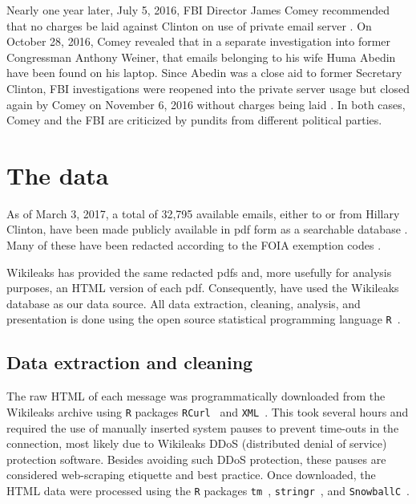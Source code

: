 \documentclass[journal]{vgtc}                %
\begin{document}
Nearly one year later, July 5, 2016,  FBI Director James Comey recommended that no charges be laid against Clinton on use of private email server \cite{nochargeFBI}.  On October 28, 2016, Comey revealed that in a separate investigation into former Congressman Anthony Weiner, that emails belonging to his wife Huma Abedin have been found on his laptop.  Since Abedin was a close aid to former Secretary Clinton, FBI investigations were reopened into the private server usage but closed again by Comey on November 6, 2016 without charges being laid \cite{nochargeFBINov}.  In both cases, Comey and the FBI are criticized by pundits from different political parties.

\section{The data}
\label{sect:data}
As of March 3, 2017, a total of 32,795 available emails, either to or from Hillary Clinton, have been made publicly available in pdf form as a searchable database \cite{StateDeptFOIA}.  Many of these have been redacted according to the FOIA exemption codes \cite{FOIA}.  

Wikileaks \cite{Wikileaks} has provided the same redacted pdfs and, more usefully for analysis purposes, an HTML version of each pdf.  Consequently, have used the Wikileaks database as our data source.   All data extraction, cleaning, analysis, and presentation is done using the open source statistical programming language \texttt{R}~\cite{Rsystem}.

\subsection{Data extraction and cleaning}
\label{sect:data:extrclean}
The raw HTML of each message was programmatically downloaded from the Wikileaks archive using \texttt{R} packages  \texttt{RCurl}~\cite{RCurl2016package} and \texttt{XML}~\cite{XML2016package}.  This took several hours and required the use of manually inserted system pauses to prevent time-outs in the connection, most likely due to Wikileaks DDoS (distributed denial of service) protection software. Besides avoiding such DDoS protection, these pauses are considered web-scraping etiquette and best practice.
Once downloaded, the HTML data were processed using the \texttt{R} packages \texttt{tm}~\cite{tm2008paper, tm2017package}, \texttt{stringr}~\cite{stringr2016package}, and \texttt{SnowballC}~\cite{snowballc2014package}.   
\end{document}
